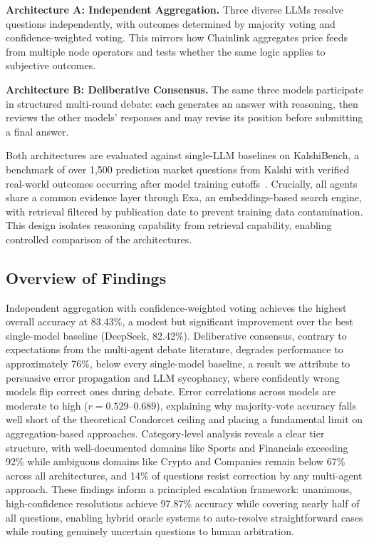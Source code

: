 \textbf{Architecture A: Independent Aggregation.} Three diverse LLMs resolve questions independently, with outcomes determined by majority voting and confidence-weighted voting. This mirrors how Chainlink aggregates price feeds from multiple node operators and tests whether the same logic applies to subjective outcomes.

\textbf{Architecture B: Deliberative Consensus.} The same three models participate in structured multi-round debate: each generates an answer with reasoning, then reviews the other models' responses and may revise its position before submitting a final answer.

Both architectures are evaluated against single-LLM baselines on KalshiBench, a benchmark of over 1,500 prediction market questions from Kalshi with verified real-world outcomes occurring after model training cutoffs~\cite{nel2025kalshibench}. Crucially, all agents share a common evidence layer through Exa, an embeddings-based search engine, with retrieval filtered by publication date to prevent training data contamination. This design isolates reasoning capability from retrieval capability, enabling controlled comparison of the architectures.

\subsection{Overview of Findings}

Independent aggregation with confidence-weighted voting achieves the highest overall accuracy at 83.43\%, a modest but significant improvement over the best single-model baseline (DeepSeek, 82.42\%). Deliberative consensus, contrary to expectations from the multi-agent debate literature, degrades performance to approximately 76\%, below every single-model baseline, a result we attribute to persuasive error propagation and LLM sycophancy, where confidently wrong models flip correct ones during debate. Error correlations across models are moderate to high ($r = 0.529$--$0.689$), explaining why majority-vote accuracy falls well short of the theoretical Condorcet ceiling and placing a fundamental limit on aggregation-based approaches. Category-level analysis reveals a clear tier structure, with well-documented domains like Sports and Financials exceeding 92\% while ambiguous domains like Crypto and Companies remain below 67\% across all architectures, and 14\% of questions resist correction by any multi-agent approach. These findings inform a principled escalation framework: unanimous, high-confidence resolutions achieve 97.87\% accuracy while covering nearly half of all questions, enabling hybrid oracle systems to 
auto-resolve straightforward cases while routing genuinely uncertain 
questions to human arbitration.